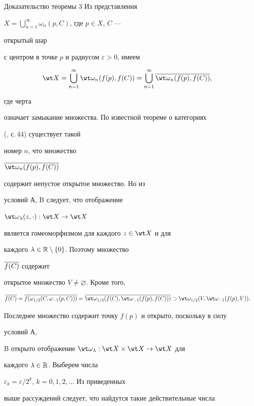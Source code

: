 \begin{pf*}{Доказательство теоремы 3} Из представления 


$X=\bigcup\limits^\infty_{n=1}\omega_n(p,C)$, где $p\in X$, $C$ --- 


открытый шар 


с центром в точке $p$ и радиусом $\varepsilon>0$, имеем 


$$ 


\wt X=\bigcup^\infty_{n=1}\wt\omega_n(f(p),f(C))=\bigcup^\infty_{n=1} 


\ovl{\wt\omega_n(f(p),f(C))}, 


$$ 


где черта 


означает замыкание множества. По известной теореме о категориях 


(\cite{Sad}, с.\,44) существует такой 


номер $n$, что множество 


$\ovl{\wt\omega_n(f(p),f(C))}$ 


содержит непустое открытое множество. Но из 


условий А, B следует, что отображение 


$\wt\omega_\lambda(z,\cdot):\wt X\to\wt X$ 


является гомеоморфизмом для каждого $z\in\wt X$ и для 


каждого $\lambda\in\Bbb R\setminus\{0\}$. Поэтому множество 


$\overline{f(C)}$ содержит 


открытое множество $V\ne\varnothing$. Кроме того, 


$$ 


\ovl{f(C)}= 


\ovl{f(\omega_{1/2}(C,\omega_{-1}(p,C)))}= 


\ovl{\wt\omega_{1/2}(f(C),\wt\omega_{-1}(f(p),f(C)))} 


\supset\wt\omega_{1/2}(V,\wt\omega_{-1}(f(p),V)). 


$$ 


Последнее множество содержит точку $f(p)$ и открыто, поскольку в силу 


условий А, 


B открыто отображение $\wt\omega_\lambda:\wt X\times\wt X\to\wt X$ для 


каждого $\lambda\in\Bbb R$. Выберем числа 


$\varepsilon_k=\varepsilon/2^k$, $k=0,1,2,\dotsc$ Из приведенных 


выше рассуждений следует, что найдутся такие действительные числа 



\end{pf*}
